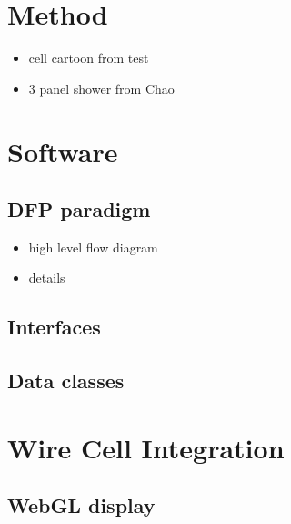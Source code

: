 \documentclass[xcolor=dvipsnames]{beamer}
\begin{document}





\section{Method}

\begin{frame}
  \begin{itemize}
  \item cell cartoon from test
  \item 3 panel shower from Chao
  \end{itemize}
\end{frame}

\section{Software}

\subsection{DFP paradigm}

\begin{frame}
  \begin{itemize}
  \item high level flow diagram
  \item details
  \end{itemize}
\end{frame}

\subsection{Interfaces}

\subsection{Data classes}

\section{Wire Cell Integration}

\subsection{WebGL display}
\end{document}
